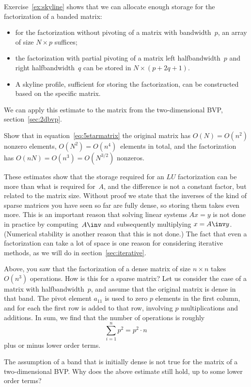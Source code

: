 Exercise~\ref{ex:skyline} shows that we can allocate enough storage for the
factorization of a banded matrix:
\begin{itemize}
\item for the factorization without pivoting of a matrix with
  bandwidth~$p$, an array of size $N\times p$ suffices;
\item the factorization with partial pivoting of a matrix left
  halfbandwidth~$p$ and right halfbandwidth~$q$ can be stored in
  $N\times (p+2q+1)$.
\item A skyline profile, sufficient for storing the factorization, can
  be constructed based on the specific matrix.
\end{itemize}

We can apply this estimate to the matrix from the two-dimensional
\ac{BVP}, section~\ref{sec:2dbvp}.  
\begin{exercise}\label{ex:bandfill}
  Show that in equation~\eqref{eq:5starmatrix} the original matrix has
  $O(N)=O(n^2)$ nonzero elements, $O(N^2)=O(n^4)$~elements in total,
  and the factorization has $O(nN)=O(n^3)=O(N^{3/2})$ nonzeros.
\end{exercise}

These estimates show that the storage required for an $LU$
factorization can be more than what is required for~$A$, and the
difference is not a constant factor, but related to the matrix
size. Without proof we state that the inverses of the kind of sparse
matrices you have seen so far are fully dense, so storing them takes
even more. This is an important reason that solving linear systems
$Ax=y$ is not done in practice by computing~$A\inv$ and subsequently multiplying
$x=A\inv y$. (Numerical stability is another reason that this is not
done.) The fact that even a factorization can take a lot of
space is one reason for considering iterative methods, as we will do
in section~\ref{sec:iterative}.

Above, you saw that the factorization of a dense matrix of size
$n\times n$ takes $O(n^3)$ operations. How is this for a sparse
matrix? Let us consider the case of a matrix with halfbandwidth~$p$,
and assume that the original matrix is dense in that band.
The pivot element $a_{11}$ is used to zero $p$ elements in the first
column, and for each the first row is added to that row, involving $p$
multiplications and additions. In sum, we find that the number of
operations is roughly
\[ \sum_{i=1}^n p^2 = p^2\cdot n \]
plus or minus lower order terms.

\begin{exercise}
  The assumption of a band that is initially dense is not true for the
  matrix of a two-dimensional \ac{BVP}. Why does the above estimate
  still hold, up to some lower order terms?
\end{exercise}

